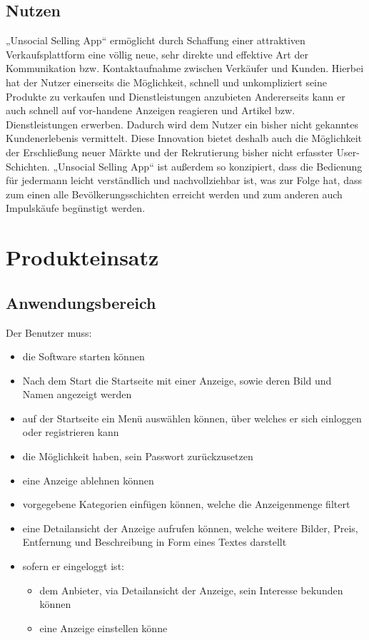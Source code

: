\documentclass[a4paper,12pt,oneside]{scrartcl}
\begin{document}
\subsection{Nutzen}
„Unsocial Selling App“ ermöglicht durch Schaffung einer attraktiven Verkaufsplattform eine völlig neue, sehr direkte und effektive Art der Kommunikation bzw. Kontaktaufnahme zwischen Verkäufer und Kunden.
Hierbei hat der Nutzer einerseits die Möglichkeit, schnell und unkompliziert seine Produkte zu verkaufen und Dienstleistungen anzubieten
Andererseits kann er auch schnell auf vor-handene Anzeigen reagieren und Artikel bzw. Dienstleistungen erwerben.
Dadurch wird dem Nutzer ein bisher nicht gekanntes Kundenerlebenis vermittelt.
Diese Innovation bietet deshalb auch die Möglichkeit der Erschließung neuer Märkte und der Rekrutierung bisher nicht erfasster User-Schichten.
„Unsocial Selling App“ ist außerdem so konzipiert, dass die Bedienung für jedermann leicht verständlich und nachvollziehbar ist, was zur Folge hat, dass zum einen alle Bevölkerungsschichten erreicht werden und zum anderen auch Impulskäufe begünstigt werden. 





\section{Produkteinsatz}
\subsection{Anwendungsbereich}
Der Benutzer muss:
\begin{itemize}
	\item die Software starten können 
	\item Nach dem Start die Startseite mit einer Anzeige, sowie deren Bild und Namen angezeigt werden 
	\item auf der Startseite ein Menü auswählen können, über welches er sich einloggen oder registrieren kann 
	\item die Möglichkeit haben, sein Passwort zurückzusetzen 
	\item eine Anzeige ablehnen können 
	\item vorgegebene Kategorien einfügen können, welche die Anzeigenmenge filtert 
	\item eine Detailansicht der Anzeige aufrufen können, welche weitere Bilder, Preis, Entfernung und Beschreibung in Form eines Textes darstellt 

	\item sofern er eingeloggt ist: 
	\begin{itemize}
		\item dem Anbieter, via Detailansicht der Anzeige, sein Interesse bekunden können
		\item eine Anzeige einstellen könne	
	\end{itemize}
\end{itemize}
\end{document}

